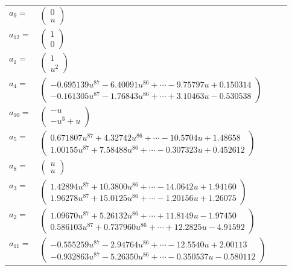 \documentclass[1p]{elsarticle_modified}
\theoremstyle{definition}
\begin{document}
\begin{tabular}{m{7pt} m{180pt} m{7pt} m{180pt} }
\flushright $a_{9}=$&$\begin{pmatrix}0\\u\end{pmatrix}$ \\
\flushright $a_{12}=$&$\begin{pmatrix}1\\0\end{pmatrix}$ \\
\flushright $a_{1}=$&$\begin{pmatrix}1\\u^2\end{pmatrix}$ \\
\flushright $a_{4}=$&$\begin{pmatrix}-0.695139 u^{87}-6.40091 u^{86}+\cdots-9.75797 u+0.150314\\-0.161305 u^{87}-1.76843 u^{86}+\cdots+3.10463 u-0.530538\end{pmatrix}$ \\
\flushright $a_{10}=$&$\begin{pmatrix}- u\\- u^3+u\end{pmatrix}$ \\
\flushright $a_{5}=$&$\begin{pmatrix}0.671807 u^{87}+4.32742 u^{86}+\cdots-10.5704 u+1.48658\\1.00155 u^{87}+7.58488 u^{86}+\cdots-0.307323 u+0.452612\end{pmatrix}$ \\
\flushright $a_{8}=$&$\begin{pmatrix}u\\u\end{pmatrix}$ \\
\flushright $a_{3}=$&$\begin{pmatrix}1.42894 u^{87}+10.3800 u^{86}+\cdots-14.0642 u+1.94160\\1.96278 u^{87}+15.0125 u^{86}+\cdots-1.20156 u+1.26075\end{pmatrix}$ \\
\flushright $a_{2}=$&$\begin{pmatrix}1.09670 u^{87}+5.26132 u^{86}+\cdots+11.8149 u-1.97450\\0.586103 u^{87}+0.737960 u^{86}+\cdots+12.2825 u-4.91592\end{pmatrix}$ \\
\flushright $a_{11}=$&$\begin{pmatrix}-0.555259 u^{87}-2.94764 u^{86}+\cdots-12.5540 u+2.00113\\-0.932863 u^{87}-5.26350 u^{86}+\cdots-0.350537 u-0.580112\end{pmatrix}$ \\

\end{tabular}
\end{document}
